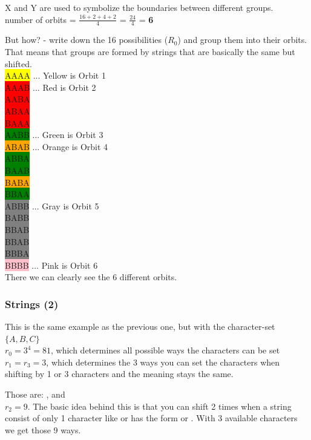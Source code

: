 \documentclass[12pt,onecolumn%
]{scrartcl}
\newcommand{\st}[4]{
\boxed{\text{#1}}\boxed{\text{#2}}\boxed{\text{#3}}\boxed{\text{#4}}
}
\begin{document}
{X and Y are used to symbolize the boundaries between different groups. \\

number of orbits = $ \frac{16+2+4+2}{4}$ = $ \frac{24}{4} $ = \textbf{6}

But how? - write down the 16 possibilities ($R_{0}$) and group them into their orbits.
That means that groups are formed by strings that are basically the same but shifted. \\

\colorbox{yellow}{AAAA} ... Yellow is Orbit 1\\
\colorbox{red}{AAAB} ... Red is Orbit 2\\
\colorbox{red}{AABA} \\
\colorbox{red}{ABAA} \\
\colorbox{red}{BAAA} \\
\colorbox{green}{AABB} ... Green is Orbit 3  \\
\colorbox{orange}{ABAB} ... Orange is Orbit 4\\
\colorbox{green}{ABBA} \\
\colorbox{green}{BAAB} \\
\colorbox{orange}{BABA} \\
\colorbox{green}{BBAA} \\
\colorbox{gray}{ABBB} ... Gray is Orbit 5\\
\colorbox{gray}{BABB} \\
\colorbox{gray}{BBAB} \\
\colorbox{gray}{BBAB} \\
\colorbox{gray}{BBBA} \\
\colorbox{pink}{BBBB} ... Pink is Orbit 6 \\

There we can clearly see the 6 different orbits.

\subsubsection{Strings (2)}
This is the same example as the previous one, but with the character-set $\{A,B,C\}$ \\
$r_{0} = 3^{4} = 81$, which determines all possible ways the characters can be set \\
$r_{1} = r_{3} = 3$, which determines the 3 ways you can set the characters when shifting by 1 or 3
characters and the meaning stays the same.

Those are: \st{A}{A}{A}{A}, \st{B}{B}{B}{B} and \st{C}{C}{C}{C} \\
$r_{2} = 9$. The basic idea behind this is that you can shift 2 times when a string consist of only 1 character
like \st{A}{A}{A}{A} or has the form \st{X}{Y}{X}{Y} or \st{Y}{X}{Y}{X}. With 3 available characters we get those 9 ways.\\

}
\end{document}
